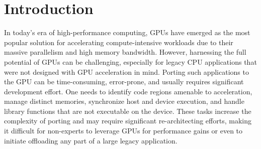 \section{Introduction}
\label{sec:introduction}

In today's era of high-performance computing, GPUs have emerged as the most popular solution for accelerating compute-intensive workloads due to their massive parallelism and high memory bandwidth. 
However, harnessing the full potential of GPUs can be challenging, especially for legacy CPU applications that were not designed with GPU acceleration in mind.
Porting such applications to the GPU can be time-consuming, error-prone, and usually requires significant development effort.
One needs to identify code regions amenable to acceleration, manage distinct memories, synchronize host and device execution, and handle library functions that are not executable on the device.
These tasks increase the complexity of porting and may require significant re-architecting efforts, making it difficult for non-experts to leverage GPUs for performance gains or even to initiate offloading any part of a large legacy application.


